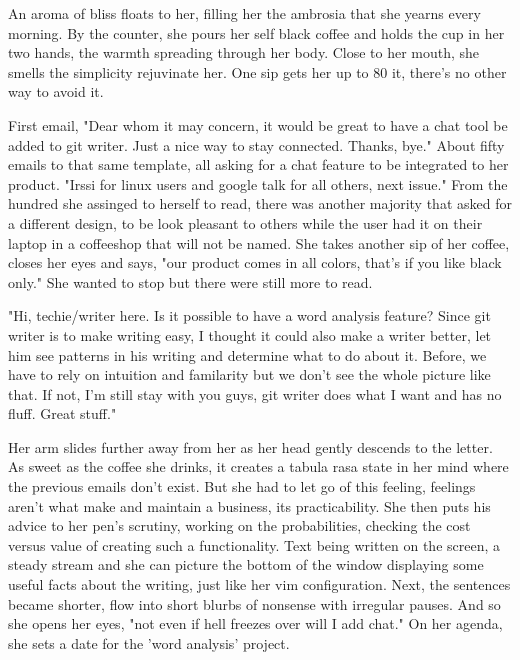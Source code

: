         An aroma of bliss floats to her, filling her the ambrosia that she yearns every morning. By the counter, she pours her self black coffee
    and holds the cup in her two hands, the warmth spreading through her body. Close to her mouth, she smells the simplicity rejuvinate her. One
    sip gets her up to 80%
    it, there's no other way to avoid it.

       First email, "Dear whom it may concern, it would be great to have a chat tool be added to git writer. Just a nice way to stay connected.
    Thanks, bye." About fifty emails to that same template, all asking for a chat feature to be integrated to her product. "Irssi for linux users
    and google talk for all others, next issue." From the hundred she assinged to herself to read, there was another majority that asked for
    a different design, to be look pleasant to others while the user had it on their laptop in a coffeeshop that will not be named. She takes
    another sip of her coffee, closes her eyes and says, "our product comes in all colors, that's if you like black only." She wanted to stop
    but there were still more to read.

        "Hi, techie/writer here. Is it possible to have a word analysis feature? Since git writer is to make writing easy, I thought it could
    also make a writer better, let him see patterns in his writing and determine what to do about it. Before, we have to rely on intuition
    and familarity but we don't see the whole picture like that. If not, I'm still stay with you guys, git writer does what I want and has
    no fluff. Great stuff."

        Her arm slides further away from her as her head gently descends to the letter. As sweet as the coffee she drinks, it creates a tabula
    rasa state in her mind where the previous emails don't exist. But she had to let go of this feeling, feelings aren't what make and
    maintain a business, its practicability. She then puts his advice to her pen's scrutiny, working on the probabilities, checking the 
    cost versus value of creating such a functionality. Text being written on the screen, a steady stream and she can picture the bottom
    of the window displaying some useful facts about the writing, just like her vim configuration. Next, the sentences became shorter, flow
    into short blurbs of nonsense with irregular pauses. And so she opens her eyes, "not even if hell freezes over will I add chat." On
    her agenda, she sets a date for the 'word analysis' project.

